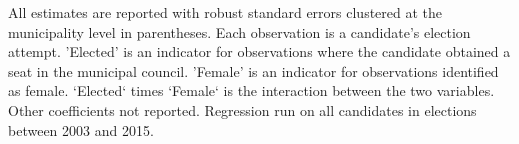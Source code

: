 \begin{table}[!h]
\begin{threeparttable}
\begin{tablenotes}[para]
\item All estimates are reported with robust standard errors clustered at the municipality level in parentheses. Each observation is a candidate's election attempt. 'Elected' is an indicator for observations where the candidate obtained a seat in the municipal council. 'Female' is an indicator for observations identified as female. `Elected` times `Female` is the interaction between the two variables. Other coefficients not reported. Regression run on all candidates in elections between 2003 and 2015.
\end{tablenotes}
\end{threeparttable}
\end{table}